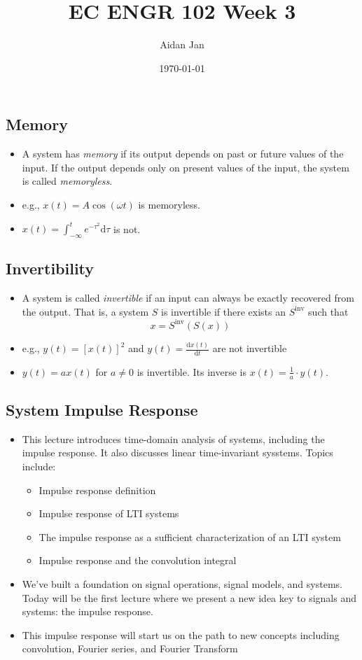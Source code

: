 \documentclass[10pt]{article}
\title{EC ENGR 102 Week 3}
\author{Aidan Jan}
\date{\today}
\begin{document}
\maketitle

\subsection*{Memory}
\begin{itemize}
    \item A system has \textit{memory} if its output depends on past or future values of the input.  If the output depends only on present values of the input, the system is called \textit{memoryless}.
    \item e.g., $x(t) = A \cos(\omega t)$ is memoryless.
    \item $x(t) = \int_{-\infty}^t e^{-\tau^2} \text{d}\tau$ is not.
\end{itemize}

\subsection*{Invertibility}
\begin{itemize}
    \item A system is called \textit{invertible} if an input can always be exactly recovered from the output.  That is, a system $S$ is invertible if there exists an $S^{\text{inv}}$ such that
    \[x = S^{\text{inv}}(S(x))\]
    \item e.g., $y(t) = [x(t)]^2$ and $y(t) = \frac{\text{d}x(t)}{\text{d}t}$ are not invertible
    \item $y(t) = ax(t)$ for $a \neq 0$ is invertible.  Its inverse is $x(t) = \frac{1}{a} \cdot y(t)$.
\end{itemize}

\subsection*{System Impulse Response}
\begin{itemize}
    \item This lecture introduces time-domain analysis of systems, including the impulse response.  It also discusses linear time-invariant sysstems.  Topics include:
    \begin{itemize}
        \item Impulse response definition
        \item Impulse response of LTI systems
        \item The impulse response as a sufficient characterization of an LTI system
        \item Impulse response and the convolution integral
    \end{itemize}
    \item We've built a foundation on signal operations, signal models, and systems.  Today will be the first lecture where we present a new idea key to signals and systems: the impulse response.
    \item This impulse response will start us on the path to new concepts including convolution, Fourier series, and Fourier Transform
\end{itemize}
\end{document}
